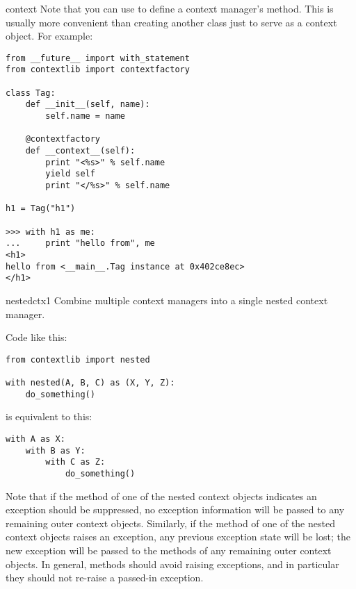 \begin{funcdesc}{context}
Note that you can use  to define a context
manager's  method.  This is usually more
convenient than creating another class just to serve as a context
object. For example:

\begin{verbatim}
from __future__ import with_statement
from contextlib import contextfactory

class Tag:
    def __init__(self, name):
        self.name = name
        
    @contextfactory
    def __context__(self):
        print "<%s>" % self.name
        yield self
        print "</%s>" % self.name
        
h1 = Tag("h1")

>>> with h1 as me:
...     print "hello from", me
<h1>
hello from <__main__.Tag instance at 0x402ce8ec>
</h1>
\end{verbatim}
\end{funcdesc}

\begin{funcdesc}{nested}{ctx1}
Combine multiple context managers into a single nested context manager.

Code like this:

\begin{verbatim}
from contextlib import nested

with nested(A, B, C) as (X, Y, Z):
    do_something()
\end{verbatim}

is equivalent to this:

\begin{verbatim}
with A as X:
    with B as Y:
        with C as Z:
            do_something()
\end{verbatim}

Note that if the  method of one of the nested
context objects indicates an exception should be suppressed, no
exception information will be passed to any remaining outer context
objects. Similarly, if the  method of one of the
nested context objects raises an exception, any previous exception
state will be lost; the new exception will be passed to the
 methods of any remaining outer context objects.
In general,  methods should avoid raising
exceptions, and in particular they should not re-raise a
passed-in exception.
\end{funcdesc}

